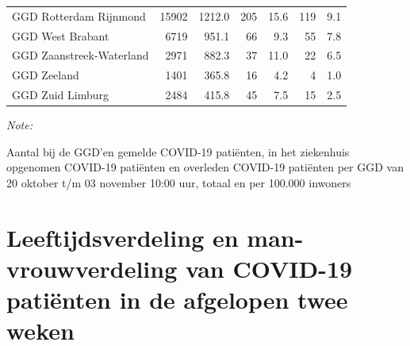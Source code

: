 \documentclass[
  english,
  man,floatsintext]{apa6}
\begin{document}
\begin{table}[H]
\begin{threeparttable}
\begin{tabular}{lrrrrrr}
GGD Rotterdam Rijnmond & 15902 & 1212.0 & 205 & 15.6 & 119 & 9.1\\
GGD West Brabant & 6719 & 951.1 & 66 & 9.3 & 55 & 7.8\\
GGD Zaanstreek-Waterland & 2971 & 882.3 & 37 & 11.0 & 22 & 6.5\\
GGD Zeeland & 1401 & 365.8 & 16 & 4.2 & 4 & 1.0\\
GGD Zuid Limburg & 2484 & 415.8 & 45 & 7.5 & 15 & 2.5\\
\bottomrule
\end{tabular}
\begin{tablenotes}
\item \textit{Note: } 
\item Aantal bij de GGD’en gemelde COVID-19 patiënten, in het ziekenhuis opgenomen COVID-19 patiënten en overleden COVID-19 patiënten per GGD van 20 oktober t/m 03 november 10:00 uur, totaal en per 100.000 inwoners
\end{tablenotes}
\end{threeparttable}
\endgroup{}
\end{table}

\newpage

\hypertarget{leeftijdsverdeling-en-man-vrouwverdeling-van-covid-19-patiuxebnten-in-de-afgelopen-twee-weken}{%
\section{Leeftijdsverdeling en man-vrouwverdeling van COVID-19 patiënten in de afgelopen twee weken}\label{leeftijdsverdeling-en-man-vrouwverdeling-van-covid-19-patiuxebnten-in-de-afgelopen-twee-weken}}
\end{document}
